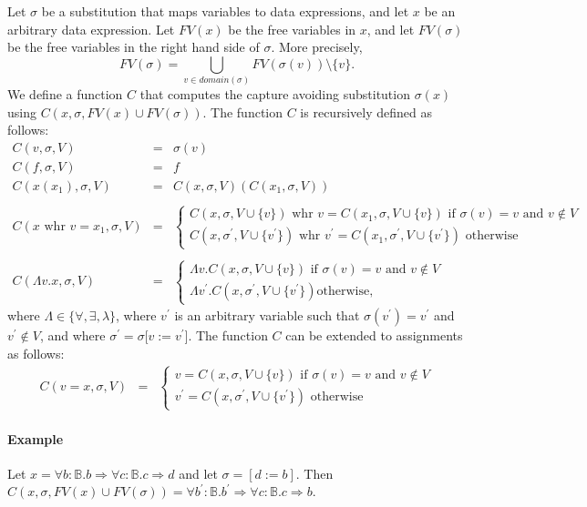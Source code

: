 \documentclass{article}
\begin{document}
Let $\sigma $ be a substitution that maps variables to data expressions, and
let $x$ be an arbitrary data expression. Let $FV(x)$ be the free variables
in $x$, and let $FV(\sigma )$ be the free variables in the right hand side
of $\sigma $. More precisely,%
\[
FV(\sigma )=\bigcup_{v\in \mathit{domain}(\sigma )}FV(\sigma (v))\setminus \{v\}.
\]%
We define a function $C$ that computes the capture avoiding substitution $%
\sigma (x)$ using $C(x,\sigma ,FV(x)\cup FV(\sigma ))$. The function $C$ is
recursively defined as follows:%
\[
\begin{array}{lll}
C(v,\sigma ,V) & = & \sigma (v) \\
C(f,\sigma ,V) & = & f \\
C(x(x_{1}),\sigma ,V) & = & C(x,\sigma ,V)(C(x_{1},\sigma ,V)) \\
&  &  \\
C(x\text{ whr }v=x_{1},\sigma ,V) & = & \left\{
\begin{array}{l}
C(x,\sigma ,V\cup \{v\})\text{ whr }v=C(x_{1},\sigma ,V\cup \{v\})\text{ if }%
\sigma (v)=v\text{ and }v\notin V \\
C(x,\sigma ^{\prime },V\cup \{v^{\prime }\})\text{ whr }v^{\prime
}=C(x_{1},\sigma ^{\prime },V\cup \{v^{\prime }\})\text{ otherwise}%
\end{array}%
\right.  \\
&  &  \\
C(\Lambda v.x,\sigma ,V) & = & \left\{
\begin{array}{l}
\Lambda v.C(x,\sigma ,V\cup \{v\})\text{ if }\sigma (v)=v\text{ and }v\notin
V \\
\Lambda v^{\prime }.C(x,\sigma ^{\prime },V\cup \{v^{\prime }\})\text{
otherwise,}%
\end{array}%
\right.
\end{array}%
\]%
where $\Lambda \in \{\forall ,\exists ,\lambda \}$, where $v^{\prime }$ is
an arbitrary variable such that $\sigma (v^{\prime })=v^{\prime }$ and $%
v^{\prime }\notin V$, and where $\sigma ^{\prime }=\sigma \lbrack
v:=v^{\prime }]$. The function $C$ can be extended to assignments as follows:%
\[
\begin{array}{lll}
C(v=x,\sigma ,V) & = & \left\{
\begin{array}{l}
v=C(x,\sigma ,V\cup \{v\})\text{ if }\sigma (v)=v\text{ and }v\notin V \\
v^{\prime }=C(x,\sigma ^{\prime },V\cup \{v^{\prime }\})\text{ otherwise}%
\end{array}%
\right.
\end{array}%
\]

\paragraph{Example}

\newcommand{\ap}{{:}}
Let $x=\forall b\ap\mathbb{B}. b\Rightarrow \forall c\ap\mathbb{B}.c\Rightarrow d$
and let $\sigma =[d:=b]$. Then $C(x,\sigma ,FV(x)\cup FV(\sigma ))=\forall
b^{\prime }\ap\mathbb{B}.b^{\prime }\Rightarrow \forall c\ap\mathbb{B}%
.c\Rightarrow b$.
\end{document}
